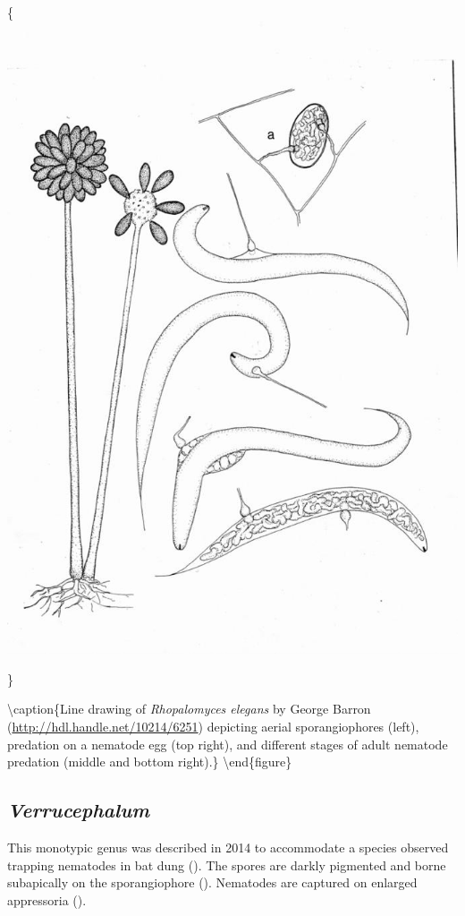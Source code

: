 \documentclass[]{book}
\begin{document}
\{\centering \includegraphics{img/Ch3_Fig6}

\}

\textbackslash caption\{Line drawing of \emph{Rhopalomyces elegans} by George Barron (\url{http://hdl.handle.net/10214/6251}) depicting aerial sporangiophores (left), predation on a nematode egg (top right), and different stages of adult nematode predation (middle and bottom right).\}\label{fig:ch3fig6}
\textbackslash end\{figure\}

\hypertarget{verrucephalum}{%
\subsection{\texorpdfstring{\emph{Verrucephalum}}{Verrucephalum}}\label{verrucephalum}}

This monotypic genus was described in 2014 to accommodate a species observed trapping nematodes in bat dung (\citet{Degawa_2014}). The spores are darkly pigmented and borne subapically on the sporangiophore (\citet{Degawa_2014}). Nematodes are captured on enlarged appressoria (\citet{Degawa_2014}).
\end{document}
